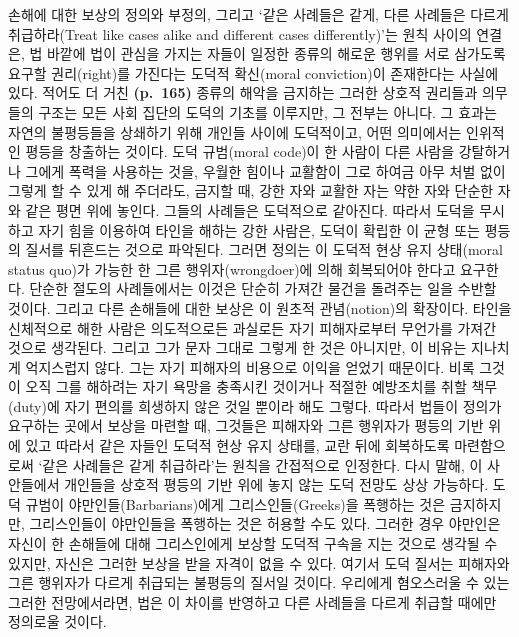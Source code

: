 손해에 대한 보상의 정의와 부정의, 그리고 ‘같은 사례들은 같게, 다른
사례들은 다르게 취급하라(Treat like cases alike and different cases
differently)’는 원칙 사이의 연결은, 법 바깥에 법이 관심을 가지는 자들이
일정한 종류의 해로운 행위를 서로 삼가도록 요구할 권리(right)를 가진다는
도덕적 확신(moral conviction)이 존재한다는 사실에 있다. 적어도 더 거친
\textbf{(p.~165)} 종류의 해악을 금지하는 그러한 상호적 권리들과 의무들의
구조는 모든 사회 집단의 도덕의 기초를 이루지만, 그 전부는 아니다. 그
효과는 자연의 불평등들을 상쇄하기 위해 개인들 사이에 도덕적이고, 어떤
의미에서는 인위적인 평등을 창출하는 것이다. 도덕 규범(moral code)이 한
사람이 다른 사람을 강탈하거나 그에게 폭력을 사용하는 것을, 우월한 힘이나
교활함이 그로 하여금 아무 처벌 없이 그렇게 할 수 있게 해 주더라도,
금지할 때, 강한 자와 교활한 자는 약한 자와 단순한 자와 같은 평면 위에
놓인다. 그들의 사례들은 도덕적으로 같아진다. 따라서 도덕을 무시하고 자기
힘을 이용하여 타인을 해하는 강한 사람은, 도덕이 확립한 이 균형 또는
평등의 질서를 뒤흔드는 것으로 파악된다. 그러면 정의는 이 도덕적 현상
유지 상태(moral status quo)가 가능한 한 그른 행위자(wrongdoer)에 의해
회복되어야 한다고 요구한다. 단순한 절도의 사례들에서는 이것은 단순히
가져간 물건을 돌려주는 일을 수반할 것이다. 그리고 다른 손해들에 대한
보상은 이 원초적 관념(notion)의 확장이다. 타인을 신체적으로 해한 사람은
의도적으로든 과실로든 자기 피해자로부터 무언가를 가져간 것으로 생각된다.
그리고 그가 문자 그대로 그렇게 한 것은 아니지만, 이 비유는 지나치게
억지스럽지 않다. 그는 자기 피해자의 비용으로 이익을 얻었기 때문이다.
비록 그것이 오직 그를 해하려는 자기 욕망을 충족시킨 것이거나 적절한
예방조치를 취할 책무(duty)에 자기 편의를 희생하지 않은 것일 뿐이라 해도
그렇다. 따라서 법들이 정의가 요구하는 곳에서 보상을 마련할 때, 그것들은
피해자와 그른 행위자가 평등의 기반 위에 있고 따라서 같은 자들인 도덕적
현상 유지 상태를, 교란 뒤에 회복하도록 마련함으로써 ‘같은 사례들은 같게
취급하라’는 원칙을 간접적으로 인정한다. 다시 말해, 이 사안들에서
개인들을 상호적 평등의 기반 위에 놓지 않는 도덕 전망도 상상 가능하다.
도덕 규범이 야만인들(Barbarians)에게 그리스인들(Greeks)을 폭행하는 것은
금지하지만, 그리스인들이 야만인들을 폭행하는 것은 허용할 수도 있다.
그러한 경우 야만인은 자신이 한 손해들에 대해 그리스인에게 보상할 도덕적
구속을 지는 것으로 생각될 수 있지만, 자신은 그러한 보상을 받을 자격이
없을 수 있다. 여기서 도덕 질서는 피해자와 그른 행위자가 다르게 취급되는
불평등의 질서일 것이다. 우리에게 혐오스러울 수 있는 그러한 전망에서라면,
법은 이 차이를 반영하고 다른 사례들을 다르게 취급할 때에만 정의로울
것이다.

